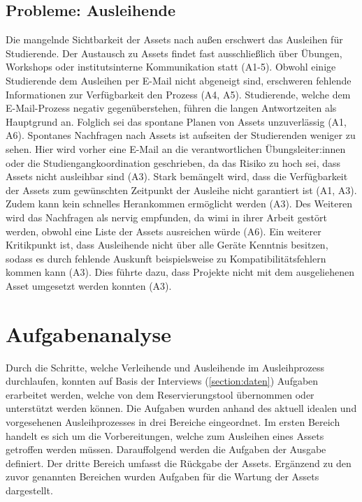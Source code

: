 \subsection{Probleme: Ausleihende}
\label{section:probleme-Ausleihende}
Die mangelnde Sichtbarkeit der Assets nach außen erschwert das Ausleihen für Studierende. Der
Austausch zu Assets findet fast ausschließlich über Übungen, Workshops oder institutsinterne
Kommunikation statt (A1-5). Obwohl einige Studierende dem Ausleihen per E-Mail nicht abgeneigt sind,
erschweren fehlende Informationen zur Verfügbarkeit den Prozess (A4, A5). Studierende, welche dem
E-Mail-Prozess negativ gegenüberstehen, führen die langen Antwortzeiten als Hauptgrund an. Folglich
sei das spontane Planen von Assets unzuverlässig (A1, A6). Spontanes Nachfragen nach Assets ist
aufseiten der Studierenden weniger zu sehen. Hier wird vorher eine E-Mail an die verantwortlichen
Übungsleiter:innen oder die Studiengangkoordination geschrieben, da das Risiko zu hoch sei, dass
Assets nicht ausleihbar sind (A3). Stark bemängelt wird, dass die Verfügbarkeit der Assets zum
gewünschten Zeitpunkt der Ausleihe nicht garantiert ist (A1, A3). Zudem kann kein schnelles
Herankommen ermöglicht werden (A3). Des Weiteren wird das Nachfragen als nervig empfunden, da
\ac{wimi} in ihrer Arbeit gestört werden, obwohl eine Liste der Assets ausreichen würde (A6). Ein
weiterer Kritikpunkt ist, dass Ausleihende nicht über alle Geräte Kenntnis besitzen, sodass es durch
fehlende Auskunft beispielsweise zu Kompatibilitätsfehlern kommen kann (A3). Dies führte dazu, dass
Projekte nicht mit dem ausgeliehenen Asset umgesetzt werden konnten (A3).

\section{Aufgabenanalyse}
\label{section:aufgaben}
Durch die Schritte, welche Verleihende und Ausleihende im Ausleihprozess durchlaufen, konnten auf
Basis der Interviews (\ref{section:daten}) Aufgaben erarbeitet werden, welche von dem
Reservierungstool übernommen oder unterstützt werden können. Die Aufgaben wurden anhand des aktuell
idealen und vorgesehenen Ausleihprozesses in drei Bereiche eingeordnet. Im ersten Bereich handelt es
sich um die Vorbereitungen, welche zum Ausleihen eines Assets getroffen werden müssen. Darauffolgend
werden die Aufgaben der Ausgabe definiert. Der dritte Bereich umfasst die Rückgabe der Assets.
Ergänzend zu den zuvor genannten Bereichen wurden Aufgaben für die Wartung der Assets dargestellt.

